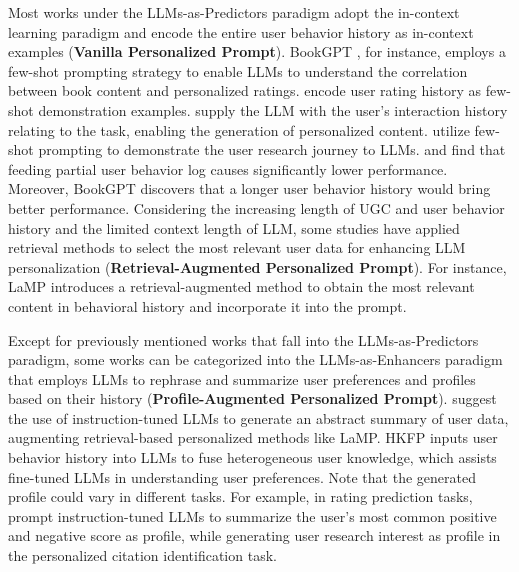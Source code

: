 \documentclass[11pt]{article}
\newcommand{\edit}[1]{\textcolor{blue}{#1}}
\newcommand{\comments}[1]{\textcolor{red}{[Re:~#1]}}
\begin{document}
\begin{mybox}
Most works under the LLMs-as-Predictors paradigm adopt the in-context learning paradigm and encode the entire user behavior history as in-context examples (\textbf{Vanilla Personalized Prompt}). BookGPT \cite{zhiyuli2023bookgpt}, for instance, employs a few-shot prompting strategy to enable LLMs to understand the correlation between book content and personalized ratings. \citet{dai2023uncovering} encode user rating history as few-shot demonstration examples. \citet{liu2023chatgpt} supply the LLM with the user's interaction history relating to the task, enabling the generation of personalized content. \citet{christakopoulou2023large} utilize few-shot prompting to demonstrate the user research journey to LLMs.
and find that feeding partial user behavior log causes significantly lower performance. Moreover, BookGPT \cite{zhiyuli2023bookgpt} discovers that a longer user behavior history would bring better performance.
Considering the increasing length of UGC and user behavior history and the limited context length of LLM, some studies have applied retrieval methods to select the most relevant user data for enhancing LLM personalization (\textbf{Retrieval-Augmented Personalized Prompt}). For instance, LaMP \cite{salemi2023lamp} introduces a retrieval-augmented method to obtain the most relevant content in behavioral history and incorporate it into the prompt. 


Except for previously mentioned works that fall into the LLMs-as-Predictors paradigm, some works can be categorized into the LLMs-as-Enhancers paradigm that employs LLMs to rephrase and summarize user preferences and profiles based on their history (\textbf{Profile-Augmented Personalized Prompt}). \citet{richardson2023integrating} suggest the use of instruction-tuned LLMs to generate an abstract summary of user data, augmenting retrieval-based personalized methods like LaMP. HKFP \cite{yin2023heterogeneous} inputs user behavior history into LLMs to fuse heterogeneous user knowledge, which assists fine-tuned LLMs in understanding user preferences. Note that the generated profile could vary in different tasks. For example, in rating prediction tasks, \citet{richardson2023integrating} prompt instruction-tuned LLMs to summarize the user's most common positive and negative score as profile, while generating user research interest as profile in the personalized citation identification task.

\end{mybox}
\end{document}
